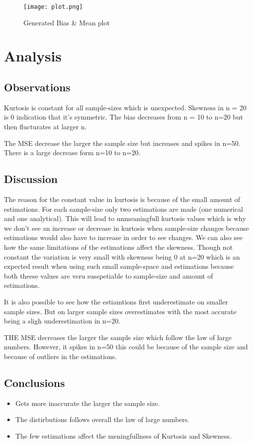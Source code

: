 \documentclass{report}
\begin{document}
\begin{figure}[H]
  \centering
  \texttt{[image: plot.png]}
  \caption{Generated Bias \& Mean plot}
  \label{fig:enter-label}
\end{figure}


\section{Analysis}

\subsection{Observations}
Kurtosis is constant for all sample-sizes which is unexpected. Skewness in n = 20 is 0 indication that it's symmetric.
The bias decreases from n = 10 to n=20 but then flucturates at larger n.

The MSE decrease the larger the sample size but increases and spikes in n=50. There is a large decrease form n=10 to n=20.


\subsection{Discussion}
The reason for the constant value in kurtosis is because of the small amount of estimations. For each sample-size only two estimations are made (one numerical and one analytical).
This will lead to unmeaningfull kurtosis values which is why we don't see an increase or decrease in kurtosis when sample-size changes because estimations would also have to
increase in order to see changes. We can also see how the same limitations of the estimations affect the skewness. Though not constant the variation is very small
with skewness being 0 at n=20 which is an expected result when using such small sample-space and estimations because both theese values are veru susspetiable to sample-size and amount of estimations.

It is also possible to see how the estiamtions first underestimate on smaller sample sizes. But on larger sample sizes overestimates with the most accurate being
a sligh underestimation in n=20.

THE MSE decreases the larger the sample size which follow the law of large numbers. However, it spikes in n=50 this could be because of the sample size and
because of outliers in the estimations.






\subsection{Conclusions}

\begin{itemize}
  \item Gets more inaccurate the larger the sample size.
  \item The distirbutions follows overall the law of large numbers.
  \item The few estimations affect the meningfullness of Kurtosis and Skewness.
\end{itemize}
\end{document}
